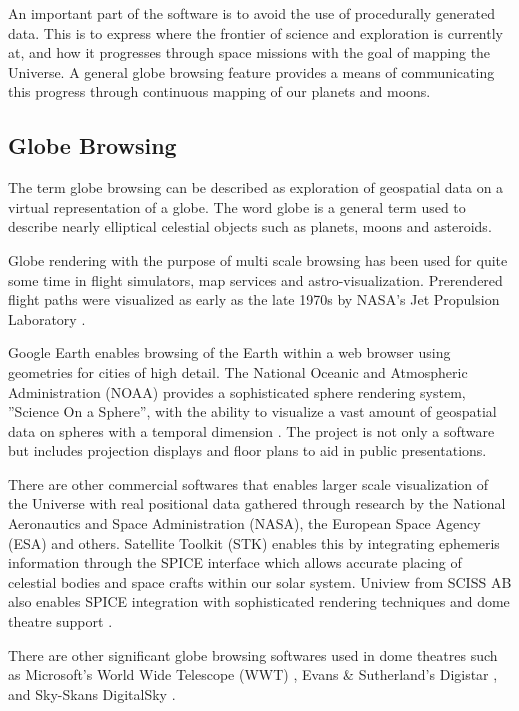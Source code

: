 An important part of the software is to avoid the use of procedurally generated data. This is to express where the frontier of science and exploration is currently at, and how it progresses through space missions with the goal of mapping the Universe. A general globe browsing feature provides a means of communicating this progress through continuous mapping of our planets and moons.

\subsection{Globe Browsing}

The term globe browsing can be described as exploration of geospatial data on a virtual representation of a globe. The word globe is a general term used to describe nearly elliptical celestial objects such as planets, moons and asteroids.

Globe rendering with the purpose of multi scale browsing has been used for quite some time in flight simulators, map services and astro-visualization. Prerendered flight paths were visualized as early as the late 1970s by NASA's Jet Propulsion Laboratory \cite{cozzi11}. 

Google Earth \cite{googlemaps} enables browsing of the Earth within a web browser using geometries for cities of high detail. The National Oceanic and Atmospheric Administration (NOAA) provides a sophisticated sphere rendering system, ''Science On a Sphere'', with the ability to visualize a vast amount of geospatial data on spheres with a temporal dimension \cite{sos}. The project is not only a software but includes projection displays and floor plans to aid in public presentations.

There are other commercial softwares that enables larger scale visualization of the Universe with real positional data gathered through research by the National Aeronautics and Space Administration (NASA), the European Space Agency (ESA) and others. Satellite Toolkit (STK) enables this by integrating ephemeris information through the SPICE interface \cite{spice} which allows accurate placing of celestial bodies and space crafts within our solar system. Uniview from SCISS AB also enables SPICE integration with sophisticated rendering techniques and dome theatre support \cite{uniview}.

There are other significant globe browsing softwares used in dome theatres such as Microsoft's World Wide Telescope (WWT) \cite{wwt}, Evans \& Sutherland's Digistar \cite{digistar}, and Sky-Skans DigitalSky \cite{digitalsky}.

